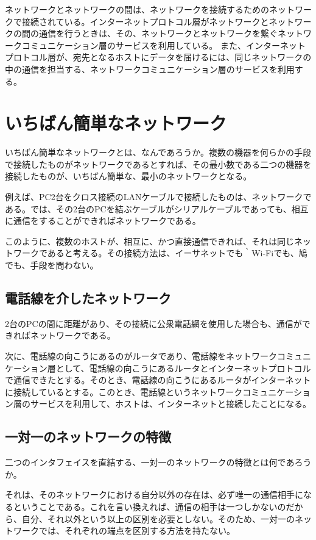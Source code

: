 ネットワークとネットワークの間は、ネットワークを接続するためのネットワークで接続されている。インターネットプロトコル層がネットワークとネットワークの間の通信を行うときは、その、ネットワークとネットワークを繋ぐネットワークコミュニケーション層のサービスを利用している。
また、インターネットプロトコル層が、宛先となるホストにデータを届けるには、同じネットワークの中の通信を担当する、ネットワークコミュニケーション層のサービスを利用する。


\section{いちばん簡単なネットワーク}

いちばん簡単なネットワークとは、なんであろうか。複数の機器を何らかの手段で接続したものがネットワークであるとすれば、その最小数である二つの機器を接続したものが、いちばん簡単な、最小のネットワークとなる。

例えば、PC2台をクロス接続のLANケーブルで接続したものは、ネットワークである。では、その2台のPCを結ぶケーブルがシリアルケーブルであっても、相互に通信をすることができればネットワークである。

このように、複数のホストが、相互に、かつ直接通信できれば、それは同じネットワークであると考える。その接続方法は、イーサネットでも｀Wi-Fiでも、鳩でも、手段を問わない。


\subsection{電話線を介したネットワーク}
2台のPCの間に距離があり、その接続に公衆電話網を使用した場合も、通信ができればネットワークである。

次に、電話線の向こうにあるのがルータであり、電話線をネットワークコミュニケーション層として、電話線の向こうにあるルータとインターネットプロトコルで通信できたとする。そのとき、電話線の向こうにあるルータがインターネットに接続しているとする。このとき、電話線というネットワークコミュニケーション層のサービスを利用して、ホストは、インターネットと接続したことになる。


\subsection{一対一のネットワークの特徴}
二つのインタフェイスを直結する、一対一のネットワークの特徴とは何であろうか。

それは、そのネットワークにおける自分以外の存在は、必ず唯一の通信相手になるということである。これを言い換えれば、通信の相手は一つしかないのだから、自分、それ以外という以上の区別を必要としない。そのため、一対一のネットワークでは、それぞれの端点を区別する方法を持たない。

